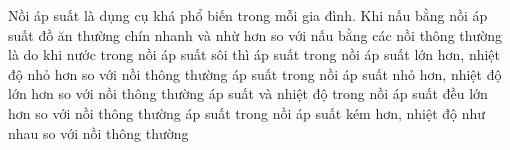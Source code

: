 	\begin{ex}%
		Nồi áp suất là dụng cụ khá phổ biến trong mỗi gia đình. Khi nấu bằng nồi áp suất đồ ăn thường chín nhanh và nhừ hơn so với nấu bằng các nồi thông thường là do khi nước trong nồi áp suất sôi thì
		\choice
		{áp suất trong nồi áp suất lớn hơn, nhiệt độ nhỏ hơn so với nồi thông thường}
		{áp suất trong nồi áp suất nhỏ hơn, nhiệt độ lớn hơn so với nồi thông thường}
		{\True áp suất và nhiệt độ trong nồi áp suất đều lớn hơn so với nồi thông thường}
		{áp suất trong nồi áp suất kém hơn, nhiệt độ như nhau so với nồi thông thường}
	\end{ex}

